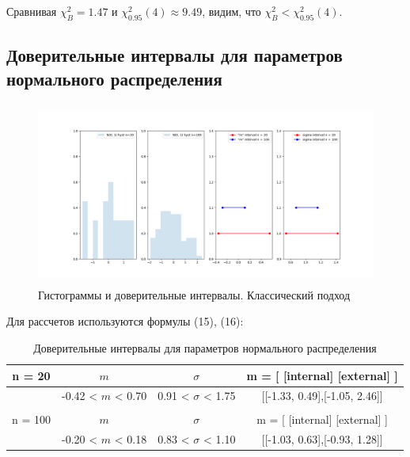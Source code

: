 \documentclass[a4paper]{article}
\begin{document}
\noindent Сравнивая $\chi^{2}_{B} = 1.47$ и $\chi^{2}_{0.95}(4) \approx 9.49$, видим, что $\chi^{2}_{B} < \chi^{2}_{0.95}(4)$.

\subsection{Доверительные интервалы для параметров нормального распределения}
    \begin{figure}[H]
		\centering
		    \includegraphics[width = 20cm, height = 6cm]{confidence_interval_classical.png}
		\caption{Гистограммы и доверительные интервалы. Классический подход}
		\label{w_pert}
	\end{figure}
		Для рассчетов используются формулы (15), (16):
	\begin{table}[H]
	    \centering
	    \begin{tabular}{| c | c | c | c |}
	    \hline
	       n = 20   &  $m$  & $\sigma$ & m = [ [internal] [external] ]\\ \hline
	          &  -0.42 < $m$ <  0.70 & 0.91 < $\sigma$ < 1.75 & [[-1.33, 0.49],[-1.05, 2.46]]\\ \hline
	         &   &  & \\ \hline
	       n = 100   &  $m$  & $\sigma$ & m = [ [internal] [external] ]\\ \hline
	        & -0.20 < $m$ < 0.18 & 0.83 < $\sigma$ < 1.10 & [[-1.03, 0.63],[-0.93, 1.28]]\\
	   \hline
	    \end{tabular}
	    \caption{Доверительные интервалы для параметров нормального распределения}
	    \label{tab:interv_simple}
	\end{table}
	
\end{document}
